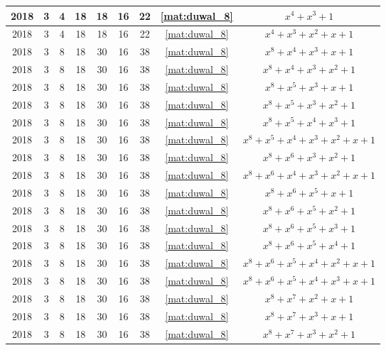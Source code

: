 \begin{longtable}{|c|c|c|c|c|c|c|c|c|}
2018 & 3 & 4 & 18 & 18 & 16 & 22 & \eqref{mat:duwal_8} & $x^4 + x^3 + 1$ \\ \hline 
2018 & 3 & 4 & 18 & 18 & 16 & 22 & \eqref{mat:duwal_8} & $x^4 + x^3 + x^2 + x + 1$ \\ \hline 
2018 & 3 & 8 & 18 & 30 & 16 & 38 & \eqref{mat:duwal_8} & $x^8 + x^4 + x^3 + x + 1$ \\ \hline 
2018 & 3 & 8 & 18 & 30 & 16 & 38 & \eqref{mat:duwal_8} & $x^8 + x^4 + x^3 + x^2 + 1$ \\ \hline 
2018 & 3 & 8 & 18 & 30 & 16 & 38 & \eqref{mat:duwal_8} & $x^8 + x^5 + x^3 + x + 1$ \\ \hline 
2018 & 3 & 8 & 18 & 30 & 16 & 38 & \eqref{mat:duwal_8} & $x^8 + x^5 + x^3 + x^2 + 1$ \\ \hline 
2018 & 3 & 8 & 18 & 30 & 16 & 38 & \eqref{mat:duwal_8} & $x^8 + x^5 + x^4 + x^3 + 1$ \\ \hline 
2018 & 3 & 8 & 18 & 30 & 16 & 38 & \eqref{mat:duwal_8} & $x^8 + x^5 + x^4 + x^3 + x^2 + x + 1$ \\ \hline 
2018 & 3 & 8 & 18 & 30 & 16 & 38 & \eqref{mat:duwal_8} & $x^8 + x^6 + x^3 + x^2 + 1$ \\ \hline 
2018 & 3 & 8 & 18 & 30 & 16 & 38 & \eqref{mat:duwal_8} & $x^8 + x^6 + x^4 + x^3 + x^2 + x + 1$ \\ \hline 
2018 & 3 & 8 & 18 & 30 & 16 & 38 & \eqref{mat:duwal_8} & $x^8 + x^6 + x^5 + x + 1$ \\ \hline 
2018 & 3 & 8 & 18 & 30 & 16 & 38 & \eqref{mat:duwal_8} & $x^8 + x^6 + x^5 + x^2 + 1$ \\ \hline 
2018 & 3 & 8 & 18 & 30 & 16 & 38 & \eqref{mat:duwal_8} & $x^8 + x^6 + x^5 + x^3 + 1$ \\ \hline 
2018 & 3 & 8 & 18 & 30 & 16 & 38 & \eqref{mat:duwal_8} & $x^8 + x^6 + x^5 + x^4 + 1$ \\ \hline 
2018 & 3 & 8 & 18 & 30 & 16 & 38 & \eqref{mat:duwal_8} & $x^8 + x^6 + x^5 + x^4 + x^2 + x + 1$ \\ \hline 
2018 & 3 & 8 & 18 & 30 & 16 & 38 & \eqref{mat:duwal_8} & $x^8 + x^6 + x^5 + x^4 + x^3 + x + 1$ \\ \hline 
2018 & 3 & 8 & 18 & 30 & 16 & 38 & \eqref{mat:duwal_8} & $x^8 + x^7 + x^2 + x + 1$ \\ \hline 
2018 & 3 & 8 & 18 & 30 & 16 & 38 & \eqref{mat:duwal_8} & $x^8 + x^7 + x^3 + x + 1$ \\ \hline 
2018 & 3 & 8 & 18 & 30 & 16 & 38 & \eqref{mat:duwal_8} & $x^8 + x^7 + x^3 + x^2 + 1$ \\ \hline 

\end{longtable}
